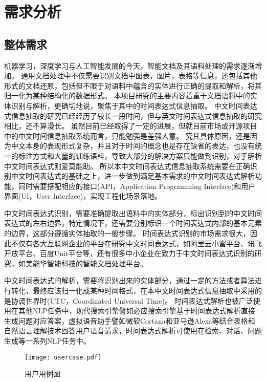 
\chapter{需求分析}

\section{整体需求}

机器学习，深度学习与人工智能发展的今天，智能文档及其语料处理的需求逐渐增加。
通用文档处理中不仅需要识别文档中图表，图片，表格等信息，还包括其他形式的文档还原，包括但不限于对语料中蕴含的实体进行正确的提取和解析，将其归一化为某种结构化的数据形式。
本项目研究的主要内容着重于文档语料中的实体识别与解析，更确切地说，聚焦于其中的时间表达式信息抽取。
中文时间表达式信息抽取的研究已经经历了较长一段时间，但与英文时间表达式信息抽取的研究相比，还不算漫长。
虽然目前已经取得了一定的进展，但就目前市场或开源项目中的中文时间信息抽取系统而言，只能勉强是差强人意。
究其具体原因，还是因为中文本身的表现形式复杂，并且对于时间的概念也是存在缺省的表达，也没有统一的标注方式和大量的训练语料，导致大部分的解决方案只能做到识别，对于解析中文时间表达式则爱莫能助。
所以本中文时间表达式信息抽取系统需要在正确识别中文时间表达式的基础之上，进一步做到满足基本需求的中文时间表达式解析功能，同时需要搭配相应的接口(API，Application Programming Interface)和用户界面(UI，User Interface)，实现工程化场景落地。

中文时间表达式识别，需要准确提取出语料中的实体部分，标出识别到的中文时间表达式的左右边界，特定情况下，还需要分别标识一个时间表达式内部的基本元素的边界，这部分遵循实体抽取的一般步骤。
时间表达式识别的市场需求很大，因此不仅有各大互联网企业的平台在研究中文时间表达式，如阿里云小蜜平台、讯飞开放平台、百度Unit平台等，还有很多中小企业在致力于中文时间表达式识别的研究，如美能华智能科技的智能文档处理平台。

中文时间表达式的解析，需要将识别出来的实体部分，通过一定的方法或者算法进行转化，最终应该归一化成某种时间格式，在本中文时间表达式信息抽取中采用的是协调世界时(UTC，Coordinated Universal Time)。
时间表达式解析也被广泛使用在其他NLP任务中，现代搜索引擎譬如必应搜索引擎基于时间表达式解析直接生成问题对应答案，虚拟语音助手譬如微软Cortana和亚马逊Alexa等结合表格和自然语言理解技术回答用户语音请求，时间表达式解析可使用在检索、对话、问题生成等一系列NLP任务中。

\begin{figure}[h]
    \centering
    \texttt{[image: usercase.pdf]}
    \caption{用户用例图}
    \label{fig:usecase}
\end{figure}


